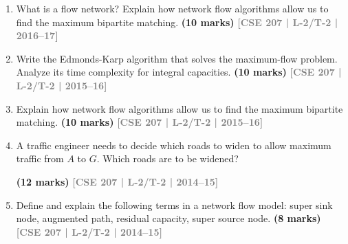 \documentclass[12pt]{article}
\newcommand{\yr}[1]{\hfill\textcolor{gray}{\small\textbf{[#1]}}}
\newcommand{\mk}[1]{\textcolor{orange!70!black}{\small\textbf{(#1 marks)}}}
\begin{document}
\begin{enumerate}
\mk{15} \yr{CSE 207 | L-2/T-2 | 2016--17}


\item What is a flow network? Explain how network flow algorithms allow us to find the maximum bipartite matching. \mk{10}
\yr{CSE 207 | L-2/T-2 | 2016--17}


\item Write the Edmonds-Karp algorithm that solves the maximum-flow problem. Analyze its time complexity for integral capacities. \mk{10}
\yr{CSE 207 | L-2/T-2 | 2015--16}


\item Explain how network flow algorithms allow us to find the maximum bipartite matching. \mk{10}
\yr{CSE 207 | L-2/T-2 | 2015--16}


\item  A traffic engineer needs to decide which roads to widen to allow maximum traffic from $A$ to $G$. Which roads are to be widened?
\begin{center}


\end{center}
\mk{12} \yr{CSE 207 | L-2/T-2 | 2014--15}


\item Define and explain the following terms in a network flow model: super sink node, augmented path, residual capacity, super source node. \mk{8}
\yr{CSE 207 | L-2/T-2 | 2014--15}



\end{enumerate}
\end{document}
